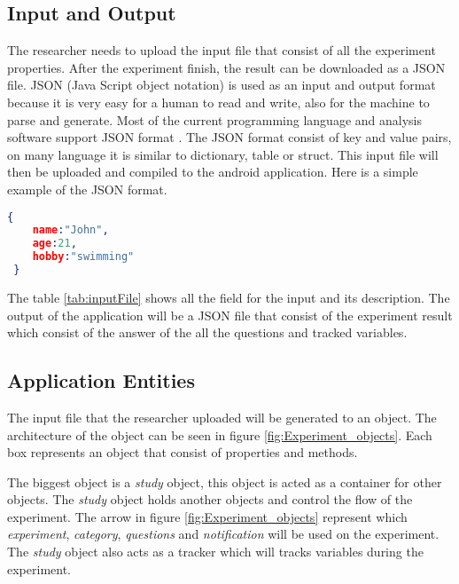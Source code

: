 \subsection{Input and Output}


The researcher needs to upload the input file that consist of all the experiment properties. After the experiment finish, the result can be downloaded as a JSON file.
JSON (Java Script object notation) is used as an input and output format because it is very easy for a human to read and write, also for the machine to parse and generate.
Most of the current programming language and analysis software support JSON format \cite{jsonDesc}.
The JSON format consist of key and value pairs, on many language it is similar to dictionary, table or struct. This input file will then be uploaded and compiled to the android application.
Here is a simple example of the JSON format.
\begin{lstlisting}[language=json,firstnumber=1]
 {
    name:"John",
    age:21,
    hobby:"swimming"
 }
\end{lstlisting}
The table \ref{tab:inputFile} shows all the field for the input and its description. The output of the application will be a JSON file that consist of the experiment result
which consist of the answer of the all the questions and tracked variables.



\subsection{Application Entities}
The input file that the researcher uploaded will be generated to an object.
The architecture of the object can be seen in figure \ref{fig:Experiment_objects}.
 Each box represents an object that consist of properties and methods.


 The biggest object is a \textit{study} object, this object is acted as a container for other objects.
The \textit{study} object holds another objects and control the flow of the experiment. The arrow in figure \ref{fig:Experiment_objects} represent which \textit{experiment}, \textit{category},
\textit{questions} and \textit{notification} will be used on the experiment. The \textit{study} object also acts as a tracker which will tracks variables during the experiment.

